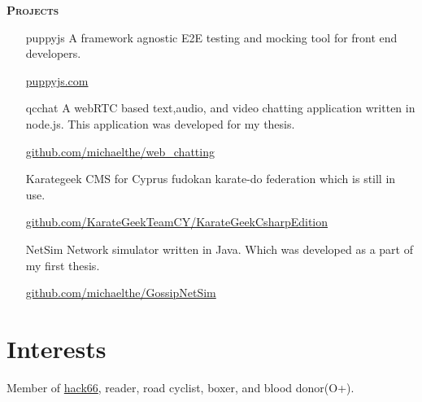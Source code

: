 \documentclass[margin, 10pt]{res} %
\begin{document}
\begin{resume}
        \textsc{ \textbf{Projects}}

        \begin{itemize}

            \item[puppyjs] A framework agnostic E2E testing and mocking tool for front end developers.

            \href{http://www.puppyjs.com}{puppyjs.com} \\

            \item[qcchat] A webRTC based text,audio, and video chatting application written in node.js.
            This application was developed for my thesis.

            \href{https://github.com/michaelthe/web_chatting}{github.com/michaelthe/web\_chatting} \\

            \item[Karategeek] CMS for Cyprus fudokan karate-do federation which is still in use.

            \href{https://github.com/KarateGeekTeamCY/KarateGeekCsharpEdition/tree/baseV4.5.1}{github.com/KarateGeekTeamCY/KarateGeekCsharpEdition} \\

            \item[NetSim] Network simulator written in Java.
            Which was developed as a part of my first thesis.

            \href{https://github.com/michaelthe/GossipNetSim}{github.com/michaelthe/GossipNetSim}

        \end{itemize}

        \section{Interests}

        Member of \href{http://hack66.info/}{hack66}, reader, road cyclist, boxer, and blood donor(O+).

    \end{resume}
\end{document}
